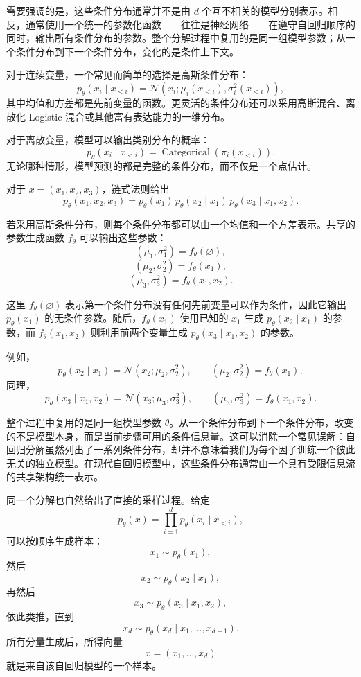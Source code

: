 需要强调的是，这些条件分布通常并不是由 $d$ 个互不相关的模型分别表示。相反，通常使用一个统一的参数化函数——往往是神经网络——在遵守自回归顺序的同时，输出所有条件分布的参数。整个分解过程中复用的是同一组模型参数；从一个条件分布到下一个条件分布，变化的是条件上下文。

对于连续变量，一个常见而简单的选择是高斯条件分布：
\[
p_\theta(x_i\mid x_{<i})
=
\mathcal{N}\!\left(
x_i;
\mu_i(x_{<i}),
\sigma_i^2(x_{<i})
\right),
\]
其中均值和方差都是先前变量的函数。更灵活的条件分布还可以采用高斯混合、离散化 Logistic 混合或其他富有表达能力的一维分布。

对于离散变量，模型可以输出类别分布的概率：
\[
p_\theta(x_i\mid x_{<i})
=
\operatorname{Categorical}\!\left(\pi_i(x_{<i})\right).
\]
无论哪种情形，模型预测的都是完整的条件分布，而不仅是一个点估计。

\begin{tcolorbox}[
  colback=blue!4,
  colframe=blue!50!black,
  title={三变量自回归示例},
  boxrule=0.6pt,
  arc=2mm,
  left=2mm,
  right=2mm,
  top=1mm,
  bottom=1mm
]
对于 $x=(x_1,x_2,x_3)$，链式法则给出
\[
p_\theta(x_1,x_2,x_3)
=
p_\theta(x_1)\,
p_\theta(x_2\mid x_1)\,
p_\theta(x_3\mid x_1,x_2).
\]

若采用高斯条件分布，则每个条件分布都可以由一个均值和一个方差表示。共享的参数生成函数 $f_\theta$ 可以输出这些参数：
\[
(\mu_1,\sigma_1^2)=f_\theta(\varnothing),
\]
\[
(\mu_2,\sigma_2^2)=f_\theta(x_1),
\]
\[
(\mu_3,\sigma_3^2)=f_\theta(x_1,x_2).
\]

这里 $f_\theta(\varnothing)$ 表示第一个条件分布没有任何先前变量可以作为条件，因此它输出 $p_\theta(x_1)$ 的无条件参数。随后，$f_\theta(x_1)$ 使用已知的 $x_1$ 生成 $p_\theta(x_2\mid x_1)$ 的参数，而 $f_\theta(x_1,x_2)$ 则利用前两个变量生成 $p_\theta(x_3\mid x_1,x_2)$ 的参数。

例如，
\[
p_\theta(x_2\mid x_1)
=
\mathcal{N}\!\left(x_2;\mu_2,\sigma_2^2\right),
\qquad
(\mu_2,\sigma_2^2)=f_\theta(x_1),
\]
同理，
\[
p_\theta(x_3\mid x_1,x_2)
=
\mathcal{N}\!\left(x_3;\mu_3,\sigma_3^2\right),
\qquad
(\mu_3,\sigma_3^2)=f_\theta(x_1,x_2).
\]
\end{tcolorbox}

整个过程中复用的是同一组模型参数 $\theta$。从一个条件分布到下一个条件分布，改变的不是模型本身，而是当前步骤可用的条件信息量。这可以消除一个常见误解：自回归分解虽然列出了一系列条件分布，却并不意味着我们为每个因子训练一个彼此无关的独立模型。在现代自回归模型中，这些条件分布通常由一个具有受限信息流的共享架构统一表示。

同一个分解也自然给出了直接的采样过程。给定
\[
p_\theta(x)
=
\prod_{i=1}^d p_\theta(x_i\mid x_{<i}),
\]
可以按顺序生成样本：
\[
x_1\sim p_\theta(x_1),
\]
然后
\[
x_2\sim p_\theta(x_2\mid x_1),
\]
再然后
\[
x_3\sim p_\theta(x_3\mid x_1,x_2),
\]
依此类推，直到
\[
x_d\sim p_\theta(x_d\mid x_1,\dots,x_{d-1}).
\]
所有分量生成后，所得向量
\[
x=(x_1,\dots,x_d)
\]
就是来自该自回归模型的一个样本。

